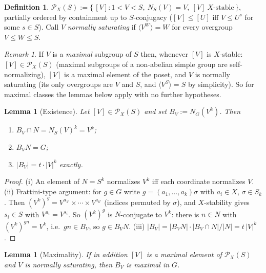 \documentclass[11pt]{amsart}
\newtheorem{lemma}[theorem]{Lemma}
\theoremstyle{definition}
\newtheorem{definition}[theorem]{Definition}
\theoremstyle{remark}
\newtheorem{remark}[theorem]{Remark}
\newcommand{\Pos}{\mathcal{P}}
\begin{document}
\begin{definition}\label{def:poset}
$\Pos_X(S):=\{\,[V] : 1<V<S,\ N_S(V)=V,\ [V]\ X\text{-stable}\,\}$,
partially ordered by containment up to $S$-conjugacy
($[V]\leq[U]$ iff $V\leq U^s$ for some $s\in S$). Call $V$
\emph{normally saturating} if $\langle V^W\rangle=W$ for every overgroup
$V\leq W\leq S$.
\end{definition}

\begin{remark}\label{rem:maxauto}
If $V$ is a \emph{maximal} subgroup of $S$ then, whenever $[V]$ is
$X$-stable: $[V]\in\Pos_X(S)$ (maximal subgroups of a non-abelian simple
group are self-normalizing), $[V]$ is a maximal element of the poset, and
$V$ is normally saturating (its only overgroups are $V$ and $S$, and
$\langle V^S\rangle=S$ by simplicity). So for maximal classes the lemmas
below apply with no further hypotheses.
\end{remark}

\begin{lemma}[Existence]\label{lem:A}
Let $[V]\in\Pos_X(S)$ and set $B_V:=N_G(V^k)$. Then
\begin{enumerate}
\item $B_V\cap N=N_S(V)^k=V^k$;
\item $B_VN=G$;
\item $|B_V|=t\cdot|V|^k$ exactly.
\end{enumerate}
\end{lemma}

\begin{proof}
(i) An element of $N=S^k$ normalizes $V^k$ iff each coordinate normalizes
$V$. (ii) Frattini-type argument: for $g\in G$ write $g=(a_1,\dots,a_k)
\sigma$ with $a_i\in X$, $\sigma\in S_k$. Then $(V^k)^g=V^{a_{1'}}\times
\cdots\times V^{a_{k'}}$ (indices permuted by $\sigma$), and $X$-stability
gives $s_i\in S$ with $V^{a_i}=V^{s_i}$. So $(V^k)^g$ is $N$-conjugate to
$V^k$: there is $n\in N$ with $(V^k)^{gn}=V^k$, i.e.\ $gn\in B_V$, so
$g\in B_VN$. (iii) $|B_V|=|B_VN|\cdot|B_V\cap N|/|N|=t\,|V|^k$.
\end{proof}

\begin{lemma}[Maximality]\label{lem:B}
If in addition $[V]$ is a maximal element of $\Pos_X(S)$ and $V$ is
normally saturating, then $B_V$ is maximal in $G$.
\end{lemma}
\end{document}
